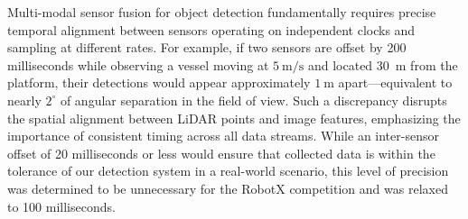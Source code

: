 \documentclass[../main.tex]{subfiles}
\begin{document}


Multi-modal sensor fusion for object detection fundamentally requires precise temporal alignment between sensors operating on independent clocks and sampling at different rates.  
For example, if two sensors are offset by 200 milliseconds while observing a vessel moving at $5~\mathrm{m/s}$ and located 30~m from the platform, their detections would appear approximately $1~\mathrm{m}$ apart—equivalent to nearly $2^{\circ}$ of angular separation in the field of view.  
Such a discrepancy disrupts the spatial alignment between LiDAR points and image features, emphasizing the importance of consistent timing across all data streams.
While an inter-sensor offset of 20 milliseconds or less would ensure that collected data is within the tolerance of our detection system in a real-world scenario, this level of precision was determined to be unnecessary for the RobotX competition and was relaxed to 100 milliseconds.


\end{document}
